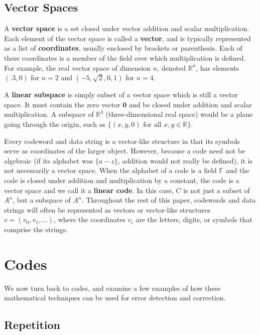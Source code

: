 \documentclass[11pt]{article}
\newcommand{\R}{\mathbb{R}}
\newcommand{\F}{\mathbb{F}}
\begin{document}
\subsection{Vector Spaces}

A \textbf{vector space} is a set closed under vector addition and scalar multiplication. Each element of the vector space is called a \textbf{vector}, and is typically represented as a list of \textbf{coordinates}, usually enclosed by brackets or parenthesis. Each of these coordinates is a member of the field over which multiplication is defined. For example, the real vector space of dimension $n$, denoted $\R^{n}$, has elements $(.3,0)$ for $n=2$ and $(-5,\sqrt{2},0,1)$ for $n=4$.

A \textbf{linear subspace} is simply subset of a vector space which is still a vector space. It must contain the zero vector $\textbf{0}$ and be closed under addition and scalar multiplication. A subspace of $\R^{3}$ (three-dimensional real space) would be a plane going through the origin, such as $\{(x,y,0)\text{ for all }x,y\in\R\}$.

Every codeword and data string is a vector-like structure in that its symbols serve as coordinates of the larger object. However, because a code need not be algebraic (if its alphabet was $\{a-z\}$, addition would not really be defined), it is not necessarily a vector space. When the alphabet of a code is a field $\F$ and the code is closed under addition and multiplication by a constant, the code is a vector space and we call it a \textbf{linear code}. In this case, $C$ is not just a subset of $A^{n}$, but a subspace of $A^{n}$. Throughout the rest of this paper, codewords and data strings will often be represented as vectors or vector-like structures $v=(v_{0},v_{1},...)$, where the coordinates $v_{i}$ are the letters, digits, or symbols that comprise the strings.

\section{Codes}

We now turn back to codes, and examine a few examples of how these mathematical techniques can be used for error detection and correction.

\subsection{Repetition}
\end{document}
